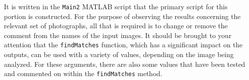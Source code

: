It is written in the \texttt{Main2} MATLAB script that the primary script for this portion is constructed. For the purpose of observing the results concerning the relevant set of photographs, all that is required is to change or remove the comment from the names of the input images. It should be brought to your attention that the \texttt{findMatches} function, which has a significant impact on the outputs, can be used with a variety of values, depending on the image being analyzed. For these arguments, there are also some values that have been tested and commented on within the \texttt{findMatches} method.